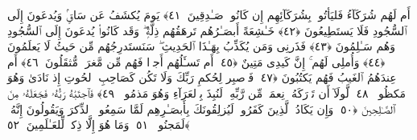  أَم لَهُم شُرَكَآءُ فَليَأتُوا۟ بِشُرَكَآئِهِم إِن كَانُوا۟ صَـٰدِقِينَ ﴿٤١﴾
 يَومَ يُكشَفُ عَن سَاقٍۢ وَيُدعَونَ إِلَى ٱلسُّجُودِ فَلَا يَستَطِيعُونَ ﴿٤٢﴾
 خَـٰشِعَةً أَبصَـٰرُهُم تَرهَقُهُم ذِلَّةٌۭ ۖ وَقَد كَانُوا۟ يُدعَونَ إِلَى ٱلسُّجُودِ وَهُم سَـٰلِمُونَ ﴿٤٣﴾
 فَذَرنِى وَمَن يُكَذِّبُ بِهَـٰذَا ٱلحَدِيثِ ۖ سَنَستَدرِجُهُم مِّن حَيثُ لَا يَعلَمُونَ ﴿٤٤﴾
 وَأُملِى لَهُم ۚ إِنَّ كَيدِى مَتِينٌ ﴿٤٥﴾
 أَم تَسـَٔلُهُم أَجرًۭا فَهُم مِّن مَّغرَمٍۢ مُّثقَلُونَ ﴿٤٦﴾
 أَم عِندَهُمُ ٱلغَيبُ فَهُم يَكتُبُونَ ﴿٤٧﴾
 فَٱصبِر لِحُكمِ رَبِّكَ وَلَا تَكُن كَصَاحِبِ ٱلحُوتِ إِذ نَادَىٰ وَهُوَ مَكظُومٌۭ ﴿٤٨﴾
 لَّولَآ أَن تَدَٟرَكَهُۥ نِعمَةٌۭ مِّن رَّبِّهِۦ لَنُبِذَ بِٱلعَرَآءِ وَهُوَ مَذمُومٌۭ ﴿٤٩﴾
 فَٱجتَبَٰهُ رَبُّهُۥ فَجَعَلَهُۥ مِنَ ٱلصَّـٰلِحِينَ ﴿٥٠﴾
 وَإِن يَكَادُ ٱلَّذِينَ كَفَرُوا۟ لَيُزلِقُونَكَ بِأَبصَـٰرِهِم لَمَّا سَمِعُوا۟ ٱلذِّكرَ وَيَقُولُونَ إِنَّهُۥ لَمَجنُونٌۭ ﴿٥١﴾
 وَمَا هُوَ إِلَّا ذِكرٌۭ لِّلعَـٰلَمِينَ ﴿٥٢﴾
 
